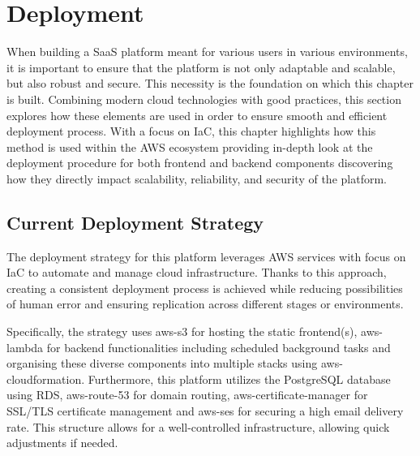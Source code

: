 \chapter{Deployment}
\label{chap:deployment}
When building a \ac{SaaS} platform meant for various users in various environments, it is important to ensure that the platform is not only adaptable and scalable, but also robust and secure.
This necessity is the foundation on which this chapter is built.
Combining modern cloud technologies with good practices, this section explores how these elements are used in order to ensure smooth and efficient deployment process.
With a focus on \ac{IaC}, this chapter highlights how this method is used within the \ac{AWS} ecosystem providing in-depth look at the deployment procedure for both frontend and backend components discovering how they directly impact scalability, reliability, and security of the platform.

\section{Current Deployment Strategy}
\label{sec:current-deployment-strategy}

The deployment strategy for this platform leverages \ac{AWS} services with focus on \ac{IaC} to automate and manage cloud infrastructure.
Thanks to this approach, creating a consistent deployment process is achieved while reducing possibilities of human error and ensuring replication across different stages or environments.

Specifically, the strategy uses \gls{aws-s3} for hosting the static frontend(s), \gls{aws-lambda} for backend functionalities including scheduled background tasks and organising these diverse components into multiple stacks using \gls{aws-cloudformation}.
Furthermore, this platform utilizes the PostgreSQL database using \ac{RDS}, \gls{aws-route-53} for domain routing, \gls{aws-certificate-manager} for SSL/TLS certificate management and \gls{aws-ses} for securing a high email delivery rate.
This structure allows for a well-controlled infrastructure, allowing quick adjustments if needed.

